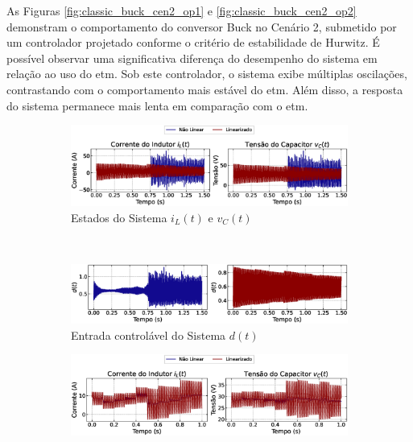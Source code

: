 As Figuras \ref{fig:classic_buck_cen2_op1} e \ref{fig:classic_buck_cen2_op2} demonstram o comportamento do conversor Buck no Cenário 2, submetido por um controlador projetado conforme o critério de estabilidade de Hurwitz. É possível observar uma significativa diferença do desempenho do sistema em relação ao uso do \acrshort{etm}. Sob este controlador, o sistema exibe múltiplas oscilações, contrastando com o comportamento mais estável do \acrshort{etm}. Além disso, a resposta do sistema permanece mais lenta em comparação com o \acrshort{etm}.

\begin{figure}[H]
  \centering
  \captionsetup{justification=centering}
  \begin{subfigure}{1.\textwidth}
    \centering
    \includegraphics[width=1.\textwidth]{figuras/classic/buck/sim2/op1/result.eps}
    \caption{Estados do Sistema $i_L(t)$  e $v_C(t)$}
  \end{subfigure}
  \\[6pt]
  \begin{subfigure}{1.\textwidth}
    \centering
    \includegraphics[width=1.\textwidth]{figuras/classic/buck/sim2/op1/duty-cycle.eps}
    \caption{Entrada controlável do Sistema $d(t)$}
  \end{subfigure}
  \caption{Conversor Buck no Cenário 2 operando em torno de $P_{\mathrm{o}, 1}$ sob controlador projetado utilizando o critério de estabilidade de Hurwitz.}
  \label{fig:classic_buck_cen2_op1}
  \begin{subfigure}{1.\textwidth}
    \centering
    \includegraphics[width=1.\textwidth]{figuras/classic/buck/sim2/op2/result.eps}

\end{subfigure}
\end{figure}
